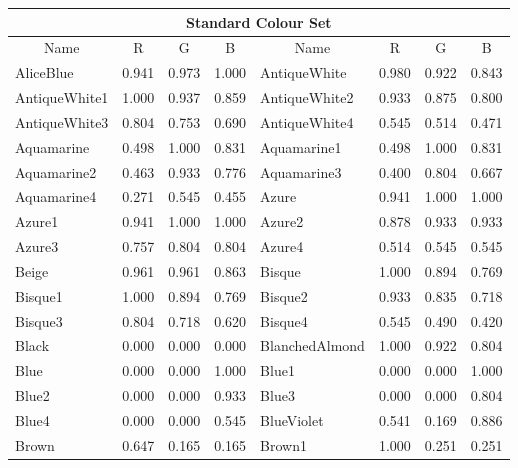 {\begin{center}
\begin{tabular}{|l|l|l|l|l|l|l|l|}
\hline
\multicolumn{8}{|c|}{{\large Standard Colour Set}} \\ \hline
\multicolumn{1}{|c|}{Name} & \multicolumn{1}{|c|}{R} & \multicolumn{1}{c|}{G} &
\multicolumn{1}{c|}{B} & \multicolumn{1}{|c|}{Name} & \multicolumn{1}{c|}{R} &
\multicolumn{1}{c|}{G} & \multicolumn{1}{c|}{B}  \\ \hline
AliceBlue           & 0.941 & 0.973 & 1.000 & AntiqueWhite        & 0.980 & 0.922 & 0.843 \\ 
AntiqueWhite1       & 1.000 & 0.937 & 0.859 & AntiqueWhite2       & 0.933 & 0.875 & 0.800 \\ 
AntiqueWhite3       & 0.804 & 0.753 & 0.690 & AntiqueWhite4       & 0.545 & 0.514 & 0.471 \\ 
Aquamarine          & 0.498 & 1.000 & 0.831 & Aquamarine1         & 0.498 & 1.000 & 0.831 \\ 
Aquamarine2         & 0.463 & 0.933 & 0.776 & Aquamarine3         & 0.400 & 0.804 & 0.667 \\ 
Aquamarine4         & 0.271 & 0.545 & 0.455 & Azure               & 0.941 & 1.000 & 1.000 \\ 
Azure1              & 0.941 & 1.000 & 1.000 & Azure2              & 0.878 & 0.933 & 0.933 \\ 
Azure3              & 0.757 & 0.804 & 0.804 & Azure4              & 0.514 & 0.545 & 0.545 \\ 
Beige               & 0.961 & 0.961 & 0.863 & Bisque              & 1.000 & 0.894 & 0.769 \\ 
Bisque1             & 1.000 & 0.894 & 0.769 & Bisque2             & 0.933 & 0.835 & 0.718 \\ 
Bisque3             & 0.804 & 0.718 & 0.620 & Bisque4             & 0.545 & 0.490 & 0.420 \\ 
Black               & 0.000 & 0.000 & 0.000 & BlanchedAlmond      & 1.000 & 0.922 & 0.804 \\ 
Blue                & 0.000 & 0.000 & 1.000 & Blue1               & 0.000 & 0.000 & 1.000 \\ 
Blue2               & 0.000 & 0.000 & 0.933 & Blue3               & 0.000 & 0.000 & 0.804 \\ 
Blue4               & 0.000 & 0.000 & 0.545 & BlueViolet          & 0.541 & 0.169 & 0.886 \\ 
Brown               & 0.647 & 0.165 & 0.165 & Brown1              & 1.000 & 0.251 & 0.251 \\ 

\end{tabular}
\end{center}}
